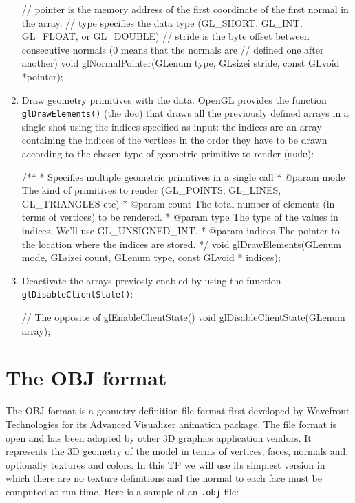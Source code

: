 \documentclass[a4paper,11pt]{article}
\newcommand{\hilight}[1]{\colorbox{bg}{#1}}
\newcommand{\coden}[1]{\texttt{#1}}
\newcommand{\code}[1]{\hilight{\texttt{#1}}}
\newcommand{\brand}[1]{\textsf{#1}\xspace}
\newcommand{\opengl}{\brand{OpenGL}}
\newcommand{\obj}{\brand{OBJ}}
\begin{document}
\begin{enumerate}
{\begin{cppcode}
// pointer is the memory address of the first coordinate of the first normal in the array. 
// type specifies the data type (GL_SHORT, GL_INT, GL_FLOAT, or GL_DOUBLE) 
// stride is the byte offset between consecutive normals (0 means that the normals are 
// defined one after another)
void glNormalPointer(GLenum type, GLsizei stride, const GLvoid *pointer);
\end{cppcode}
}
	\item Draw geometry primitives with the data. \opengl provides the function \coden{glDrawElements()} (\href{https://www.opengl.org/sdk/docs/man/html/glDrawElements.xhtml}{the doc}) that draws all the previously defined arrays in a single shot using the indices specified as input: the indices are an array containing the indices of the vertices in the order they have to be drawn according to the chosen type of geometric primitive to render (\code{mode}):\\
{\smaller
\begin{cppcode}
/**
 * Specifies multiple geometric primitives in a single call
 * @param mode The kind of primitives to render (GL_POINTS, GL_LINES, GL_TRIANGLES etc)
 * @param count The total number of elements (in terms of vertices) to be rendered.
 * @param type The type of the values in indices. We'll use GL_UNSIGNED_INT.
 * @param indices The pointer to the location where the indices are stored.
 */
void glDrawElements(GLenum mode, GLsizei count, GLenum type, const GLvoid * indices);
\end{cppcode}
}
	
	\item Deactivate the arrays previosly enabled by using the function \coden{glDisableClientState()}:\\

{\smaller
\begin{cppcode}
// The opposite of glEnableClientState()
void glDisableClientState(GLenum array);
\end{cppcode}
}


\end{enumerate}



\section{The OBJ format}

The \obj format is a geometry definition file format first developed by \brand{Wavefront Technologies} for its \brand{Advanced Visualizer} animation package. The file format is open and has been adopted by other 3D graphics application vendors. It represents the 3D geometry of the model in terms of vertices, faces, normals and, optionally textures and colors. In this TP we will use its simplest version in which there are no texture definitions and the normal to each face must be computed at run-time. Here is a sample of an \coden{.obj} file:\\
\end{document}
